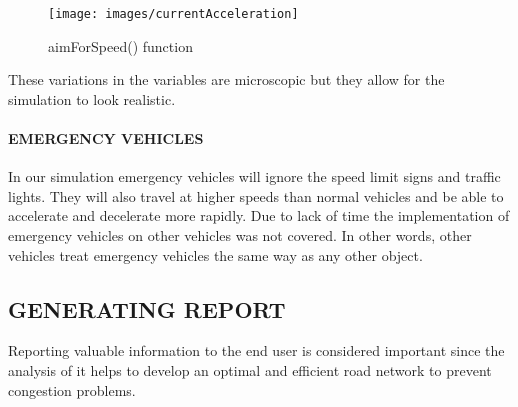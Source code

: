 \documentclass[11pt,a4paper]{article}
\begin{document}
	\begin{figure}[h!]
			\texttt{[image: images/currentAcceleration]}
			\caption{aimForSpeed() function}
			\centering
		\end{figure} 
  
  These variations in the variables are microscopic but they allow for the simulation to look realistic.
  
  	\paragraph{EMERGENCY VEHICLES}
  	
  	In our simulation emergency vehicles will ignore the speed limit signs and traffic lights. They will also travel at higher speeds than normal vehicles and be able to accelerate and decelerate more rapidly. 
Due to lack of time the implementation of emergency vehicles on other vehicles was not covered. In other words, other vehicles treat emergency vehicles the same way as any other object. 
  
  \subsection{GENERATING REPORT}
  Reporting valuable information to the end user is considered
  important since the analysis of it helps to develop an optimal and
  efficient road network to prevent congestion problems.
  
\end{document}
